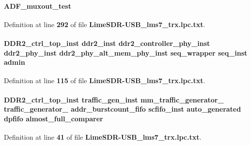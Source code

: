 \paragraph[{A\+D\+F\+\_\+muxout\+\_\+test}]{ A\+D\+F\+\_\+muxout\+\_\+test}\label{LimeSDR-USB__lms7__trx_8lpc_8txt_ad05700890d21a837ab0a49981a7db166}


Definition at line {\bf 292} of file {\bf Lime\+S\+D\+R-\/\+U\+S\+B\+\_\+lms7\+\_\+trx.\+lpc.\+txt}.

\paragraph[{admin}]{ {\bf D\+D\+R2\+\_\+ctrl\+\_\+top\+\_\+inst} {\bf ddr2\+\_\+inst} {\bf ddr2\+\_\+controller\+\_\+phy\+\_\+inst} {\bf ddr2\+\_\+phy\+\_\+inst} {\bf ddr2\+\_\+phy\+\_\+alt\+\_\+mem\+\_\+phy\+\_\+inst} {\bf seq\+\_\+wrapper} {\bf seq\+\_\+inst} admin}\label{LimeSDR-USB__lms7__trx_8lpc_8txt_a9eaef93b77cc7802bfe4b6b30db1db51}


Definition at line {\bf 115} of file {\bf Lime\+S\+D\+R-\/\+U\+S\+B\+\_\+lms7\+\_\+trx.\+lpc.\+txt}.

\paragraph[{almost\+\_\+full\+\_\+comparer}]{ {\bf D\+D\+R2\+\_\+ctrl\+\_\+top\+\_\+inst} {\bf traffic\+\_\+gen\+\_\+inst} {\bf mm\+\_\+traffic\+\_\+generator\+\_} {\bf traffic\+\_\+generator\+\_} {\bf addr\+\_\+burstcount\+\_\+fifo} scfifo\+\_\+inst {\bf auto\+\_\+generated} {\bf dpfifo} almost\+\_\+full\+\_\+comparer}\label{LimeSDR-USB__lms7__trx_8lpc_8txt_a8b8864a0d09e8bcca77e956393346abb}


Definition at line {\bf 41} of file {\bf Lime\+S\+D\+R-\/\+U\+S\+B\+\_\+lms7\+\_\+trx.\+lpc.\+txt}.

